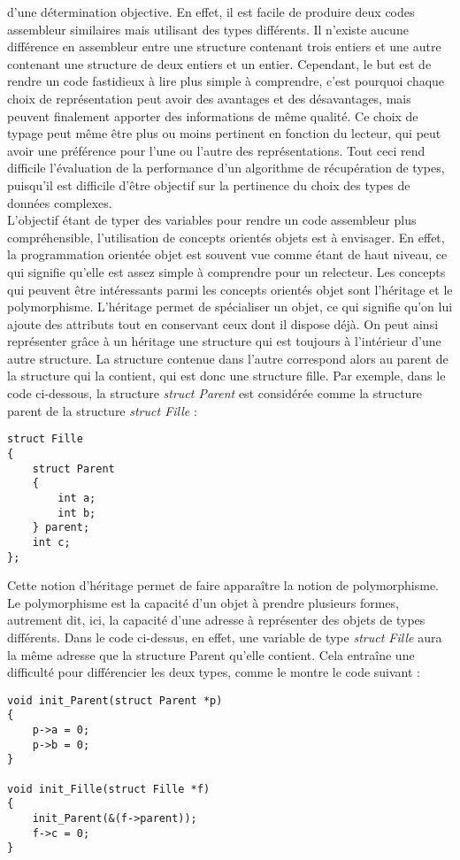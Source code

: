 \documentclass[a4paper,12pt]{article}
\begin{document}
d'une détermination objective. En effet, il est facile de produire deux
codes assembleur similaires mais utilisant des types différents. Il n'existe
aucune différence en assembleur entre une structure contenant trois entiers
et une autre contenant une structure de deux entiers et un entier. 
Cependant, le but est de rendre un code fastidieux à lire plus simple à
comprendre, c'est pourquoi chaque choix de représentation peut avoir des
avantages et des désavantages, mais peuvent finalement apporter des
informations de même qualité. Ce choix de typage peut même être plus ou
moins pertinent en fonction du lecteur, qui peut avoir une préférence pour
l'une ou l'autre des représentations. Tout ceci rend difficile l'évaluation
de la performance d'un algorithme de récupération de types, puisqu'il est
difficile d'être objectif sur la pertinence du choix des types de données
complexes. \\
L'objectif étant de typer des variables pour rendre un code assembleur plus
compréhensible, l'utilisation de concepts orientés objets est à envisager.
En effet, la programmation orientée objet est souvent vue comme étant de
haut niveau, ce qui signifie qu'elle est assez simple à comprendre pour un
relecteur. Les concepts qui peuvent être intéressants parmi les concepts
orientés objet sont l'héritage et le polymorphisme.
L'héritage permet de spécialiser un objet, ce qui signifie qu'on lui ajoute
des attributs tout en conservant ceux dont il dispose déjà. On peut ainsi
représenter grâce à un héritage une structure qui est toujours à
l'intérieur d'une autre structure. La structure contenue dans l'autre
correspond alors au parent de la structure qui la contient, qui est donc une
structure fille. Par exemple, dans le code ci-dessous, la structure
\textit{struct Parent} est considérée comme la structure parent de la
structure \textit{struct Fille} :
\begin{lstlisting}
struct Fille
{
	struct Parent
	{
		int a;
		int b;
	} parent;
	int c;
};
\end{lstlisting}
Cette notion d'héritage permet de faire apparaître la notion de
polymorphisme. Le polymorphisme est la capacité d'un objet à prendre
plusieurs formes, autrement dit, ici, la capacité d'une adresse à
représenter des objets de types différents. Dans le code ci-dessus, en 
effet, une variable de type \textit{struct Fille} aura la même adresse
que la structure Parent qu'elle contient. Cela entraîne une difficulté pour
différencier les deux types, comme le montre le code suivant :
\begin{lstlisting}
void init_Parent(struct Parent *p)
{
	p->a = 0;
	p->b = 0;
}

void init_Fille(struct Fille *f)
{
	init_Parent(&(f->parent));
	f->c = 0;
}
\end{lstlisting}
\end{document}
